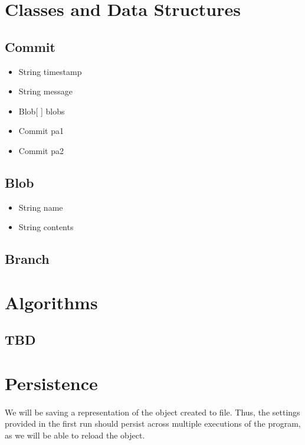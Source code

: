 \documentclass[10pt]{article}
\begin{document}
\newpage

\section{Classes and Data Structures} %
\subsection{Commit} %
  \begin{adjustwidth}{2em}{0pt}
  \begin{itemize}
  \item String timestamp
  \item String message
  \item Blob[ ] blobs
  \item Commit pa1
  \item Commit pa2
  \end{itemize}
  \end{adjustwidth}
 
\subsection{Blob} %
\begin{adjustwidth}{2em}{0pt}
  \begin{itemize}
  \item String name
  \item String contents
  \end{itemize}
  \end{adjustwidth}
  
\subsection{Branch} %

\section{Algorithms} %
\subsection{TBD} %


\section{Persistence} %

\paragraph{} We will be saving a representation of the object created to file. Thus, the settings provided in the first run should persist across multiple executions of the program, as we will be able to reload the object.
\end{document}
